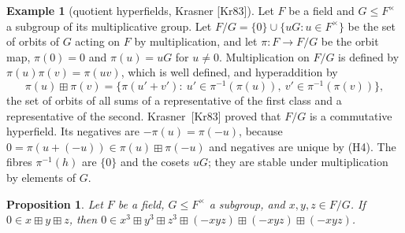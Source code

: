 \documentclass[11pt]{article}
\theoremstyle{plain}
\newtheorem{proposition}[theorem]{Proposition}
\theoremstyle{definition}
\newtheorem{example}[theorem]{Example}
\newcommand{\bp}{\boxplus}
\begin{document}
\begin{example}[quotient hyperfields, Krasner {[Kr83]}]\label{ex:quotient}
Let $F$ be a field and $G\leq F^\times$ a subgroup of its multiplicative
group.  Let $F/G=\{0\}\cup\{uG:u\in F^\times\}$ be the set of orbits of
$G$ acting on $F$ by multiplication, and let $\pi\colon F\to F/G$ be the
orbit map, $\pi(0)=0$ and $\pi(u)=uG$ for $u\neq0$.  Multiplication on
$F/G$ is defined by $\pi(u)\pi(v)=\pi(uv)$, which is well defined, and
hyperaddition by
\[
 \pi(u)\bp\pi(v)
 =\bigl\{\pi(u'+v'):\ u'\in\pi^{-1}(\pi(u)),\ v'\in\pi^{-1}(\pi(v))\bigr\},
\]
the set of orbits of all sums of a representative of the first class
and a representative of the second.  Krasner~[Kr83] proved that $F/G$
is a commutative hyperfield.  Its negatives are $-\pi(u)=\pi(-u)$,
because $0=\pi(u+(-u))\in\pi(u)\bp\pi(-u)$ and negatives are unique by
(H4).  The fibres $\pi^{-1}(h)$ are $\{0\}$ and the cosets $uG$; they
are stable under multiplication by elements of $G$.
\end{example}
\begin{proposition}\label{prop:quotient}
Let $F$ be a field, $G\leq F^\times$ a subgroup, and $x,y,z\in F/G$.
If $0\in x\bp y\bp z$, then
$0\in x^3\bp y^3\bp z^3\bp(-xyz)\bp(-xyz)\bp(-xyz)$.
\end{proposition}
\end{document}
